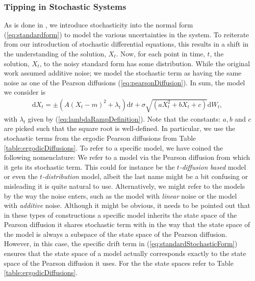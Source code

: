 \subsubsection{Tipping in Stochastic Systems}
As is done in \cite[equation (1)]{Ditlevsen2023}, we introduce stochasticity into the normal form (\ref{eq:standardform}) to model the various uncertainties in the system. To reiterate from our introduction of stochastic differential equations, this results in a shift in the understanding of the solution, $X_t$. Now, for each point in time, $t$, the solution, $X_t$, to the noisy standard form has some distribution. While the original work assumed additive noise; we model the stochastic term as having the same noise as one of the Pearson diffusions (\ref{eq:pearsonDiffusion}). In sum, the model we consider is
\begin{align}
    \mathrm{d}X_t = \pm\left(A\left(X_t - m\right)^2 + \lambda_t\right)\mathrm{d}t + \sigma\sqrt{\left(aX_t^2 + bX_t + c\right)}\mathrm{d}W_t, \label{eq:standardStochasticForm}
\end{align}
with $\lambda_t$ given by (\ref{eq:lambdaRampDefinition}). Note that the constants: $a, b$ and $c$ are picked such that the square root is well-defined. In particular, we use the stochastic terms from the ergodic Pearson diffusions from Table \ref{table:ergodicDiffusions}. To refer to a specific model, we have coined the following nomenclature: We refer to a model via the Pearson diffusion from which it gets its stochastic term. This could for instance be the \textit{$t$-diffusion based} model or even the \textit{$t$-distribution} model, albeit the last name might be a bit confusing or misleading it is quite natural to use. Alternatively, we might refer to the models by the way the noise enters, such as the model with \textit{linear} noise or the model with \textit{additive} noise. Although it might be obvious, it needs to be pointed out that in these types of constructions a specific model inherits the state space of the Pearson diffusion it shares stochastic term with in the way that the state space of the model is always a subspace of the state space of the Pearson diffusion. However, in this case, the specific drift term in (\ref{eq:standardStochasticForm}) ensures that the state space of a model actually corresponds exactly to the state space of the Pearson diffusion it uses. For the the state spaces refer to Table \ref{table:ergodicDiffusions}.\\\\
